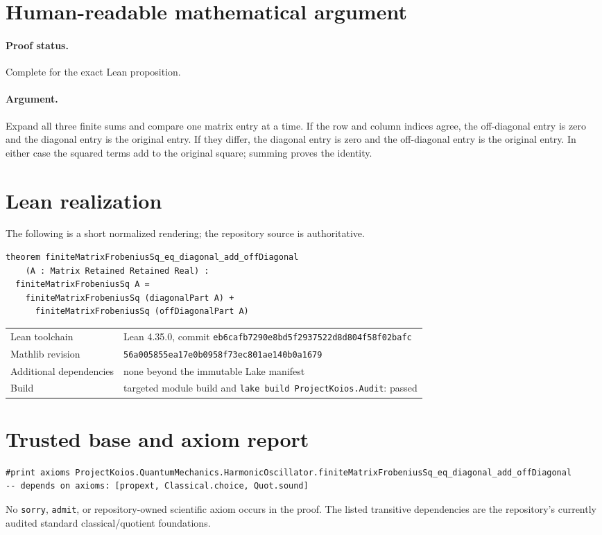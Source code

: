 \documentclass[11pt]{article}
\begin{document}
\section{Human-readable mathematical argument}
\paragraph{Proof status.} Complete for the exact Lean proposition.
\paragraph{Argument.} Expand all three finite sums and compare one matrix entry at a time.  If the row and column indices agree, the off-diagonal entry is zero and the diagonal entry is the original entry.  If they differ, the diagonal entry is zero and the off-diagonal entry is the original entry.  In either case the squared terms add to the original square; summing proves the identity.

\section{Lean realization}
The following is a short normalized rendering; the repository source is authoritative.
\begin{lstlisting}
theorem finiteMatrixFrobeniusSq_eq_diagonal_add_offDiagonal
    (A : Matrix Retained Retained Real) :
  finiteMatrixFrobeniusSq A =
    finiteMatrixFrobeniusSq (diagonalPart A) +
      finiteMatrixFrobeniusSq (offDiagonalPart A)
\end{lstlisting}
\begin{tabularx}{\textwidth}{@{}lY@{}}\toprule
Lean toolchain & Lean 4.35.0, commit \texttt{eb6cafb7290e8bd5f2937522d8d804f58f02bafc} \\
Mathlib revision & \texttt{56a005855ea17e0b0958f73ec801ae140b0a1679} \\
Additional dependencies & none beyond the immutable Lake manifest \\
Build & targeted module build and \texttt{lake build ProjectKoios.Audit}: passed \\
\bottomrule\end{tabularx}

\section{Trusted base and axiom report}
\begin{lstlisting}
#print axioms ProjectKoios.QuantumMechanics.HarmonicOscillator.finiteMatrixFrobeniusSq_eq_diagonal_add_offDiagonal
-- depends on axioms: [propext, Classical.choice, Quot.sound]
\end{lstlisting}
No \texttt{sorry}, \texttt{admit}, or repository-owned scientific axiom occurs in the
proof. The listed transitive dependencies are the repository's currently audited standard
classical/quotient foundations.
\end{document}
